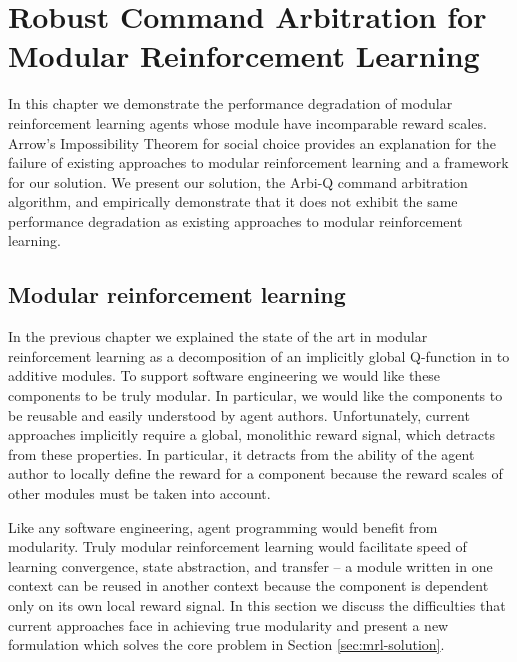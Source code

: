 \chapter{Robust Command Arbitration for Modular Reinforcement Learning}\label{ch:arbiq}

In this chapter we demonstrate the performance degradation of modular reinforcement learning agents whose module have incomparable reward scales. Arrow's Impossibility Theorem for social choice provides an explanation for the failure of existing approaches to modular reinforcement learning and a framework for our solution. We present our solution, the Arbi-Q command arbitration algorithm, and empirically demonstrate that it does not exhibit the same performance degradation as existing approaches to modular reinforcement learning.

\section{Modular reinforcement learning}

In the previous chapter we explained the state of the art in modular reinforcement learning as a decomposition of an implicitly global Q-function in to additive modules. To support software engineering we would like these components to be truly modular. In particular, we would like the components to be reusable and easily understood by agent authors.  Unfortunately, current approaches implicitly require a global, monolithic reward signal, which detracts from these properties.  In particular, it detracts from the ability of the agent author to locally define the reward for a component because the reward scales of other modules must be taken into account.

Like any software engineering, agent programming would benefit from modularity.  Truly modular reinforcement learning would facilitate speed of learning convergence, state abstraction, and transfer -- a module written in one context can be reused in another context because the component is dependent only on its own local reward signal.  In this section we discuss the difficulties that current approaches face in achieving true modularity and present a new formulation which solves the core problem in Section \ref{sec:mrl-solution}.

